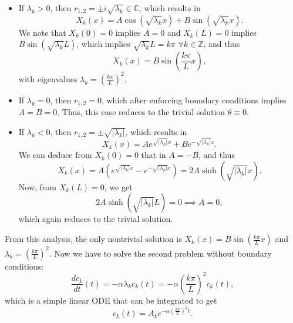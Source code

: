 \begin{itemize}
    \item If $\lambda_k>0$, then $r_{1,2} = \pm i \sqrt{\lambda_k}\in\mathbb C$, which results in
    \begin{equation*}
        X_k(x) = A\cos(\sqrt{\lambda_k}x) + B\sin(\sqrt{\lambda_k}x).
    \end{equation*} 
    We note that $X_k(0)=0$ implies $A=0$ and $X_k(L)=0$ implies $B\sin(\sqrt{\lambda_k}L)$, which implies $\sqrt{\lambda_k}L = k\pi$ $\forall k\in\mathbb Z$, and thus 
    \begin{equation*}
        X_k(x) = B\sin\left(\frac{k\pi}{L}x\right),
    \end{equation*}
    with eigenvalues $\lambda_k = \left(\frac{k\pi}{L}\right)^2$. 
    \item If $\lambda_k = 0$, then $r_{1,2} = 0$, which after enforcing boundary conditions implies $A = B = 0$. Thus, this case reduces to the trivial solution $\theta\equiv 0$. 
    \item If $\lambda_k<0$, then $r_{1,2} = \pm\sqrt{|\lambda_k|}$, which results in 
    \begin{equation*}
        X_k(x) = Ae^{\sqrt{|\lambda_k|}x} + B e^{-\sqrt{|\lambda_k|}x}.
    \end{equation*}
    We can deduce from $X_k(0)=0$ that  in $A=-B$, and thus 
    \begin{equation*}
        X_k(x) = A\left(e^{\sqrt{|\lambda_k|}x} -e^{-\sqrt{|\lambda_k|}x}\right) = 2A\sinh(\sqrt{|\lambda_k|}x).
    \end{equation*}
    Now, from $X_k(L)=0$, we get 
    \begin{equation*}
        2A\sinh(\sqrt{|\lambda_k|}L) = 0 \implies A = 0,
    \end{equation*}
    which again reduces to the trivial solution. 
\end{itemize}
From this analysis, the only nontrivial solution is $X_k(x) = B\sin\left(\frac{k\pi}{L}x\right)$ and $\lambda_k = \left(\frac{k\pi}{L}\right)^2$. Now we have to solve the second problem without boundary conditions: 
\begin{equation*}
    \frac{dc_k}{dt}(t) = -\alpha\lambda_k c_k(t) = -\alpha\left(\frac{k\pi}{L}\right)^2 c_k(t),
\end{equation*}
which is a simple linear ODE that can be integrated to get 
\begin{equation*}
    c_k(t) = A_k e^{-\alpha\left(\frac{k\pi}{L}\right)^2 t}.
\end{equation*}
